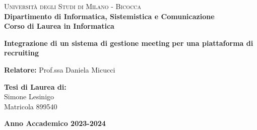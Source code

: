 \begin{titlepage}
    
    \noindent
    \begin{minipage}[t]{0.19\textwidth}
    \end{minipage}
    \hspace{2mm}
    \begin{minipage}[t]{0.95\textwidth}
    {
            {\textsc{Università degli Studi di Milano - Bicocca}} \\
            \textbf{Dipartimento di Informatica, Sistemistica e Comunicazione} \\
            \textbf{Corso di Laurea in Informatica} \\
            \par
    }
    \end{minipage}
    
\vspace{40mm}
    
\begin{center}
        {\Large{
                \textbf{Integrazione di un sistema di gestione meeting}
                \textbf{per una piattaforma di recruiting}
                \par
        }}

    \end{center}
    
    \vspace{50mm}

    \noindent
    {\large \textbf{Relatore:} Prof.ssa Daniela Micucci} \\
    
    \vspace{15mm}

    \begin{flushright}
        {\large \textbf{Tesi di Laurea di:}} \\
        \large{Simone Lesinigo} \\
        \large{Matricola 899540} 
    \end{flushright}
    
    \vspace{20mm}
    \begin{center}
        {\large{\bf Anno Accademico 2023-2024}}
    \end{center}

    
\end{titlepage}

